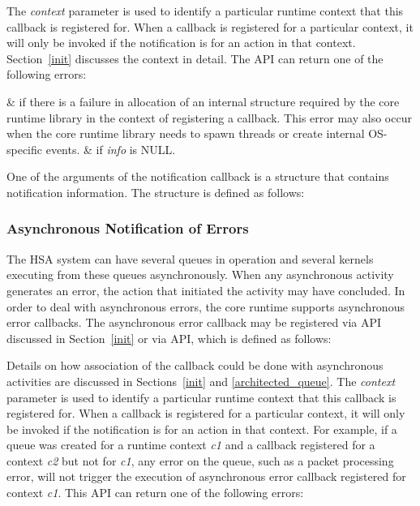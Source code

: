 

The {\itshape context} parameter is used to identify a particular
runtime context that this callback is registered for. When a
callback is registered for a particular context, it will only be
invoked if the notification is for an action in that context.
Section~\ref{init} discusses the context in detail. The
 API can return one of
the following errors:
\begin{easylist}
&  if there is a failure
in allocation of an internal structure required by the core runtime
library in the context of registering a callback. This error may
also occur when the core runtime library needs to spawn threads or
create internal OS-specific events. 
&  
if {\itshape info} is NULL.
\end{easylist}

One of the arguments of the notification callback is a structure
that contains notification information. The structure is defined as
follows:



\subsubsection{Asynchronous Notification of Errors}\label{asynnotif}

The HSA system can have several queues in operation and
several kernels executing from these queues asynchronously.
When any asynchronous activity generates an error, the action that
initiated the activity may have concluded. In order to deal with
asynchronous errors, the core runtime supports asynchronous error
callbacks. The asynchronous error callback may be registered via
 API discussed in Section~\ref{init} or via
 API, which is defined as
follows:



Details on how association of the callback could be done with
asynchronous activities are discussed in Sections~\ref{init} and
\ref{architected_queue}.  The {\itshape context} parameter is used
to identify a particular runtime context that this callback is
registered for. When a callback is registered for a particular
context, it will only be invoked if the notification is for an
action in that context. For example, if a queue was created for a
runtime context {\itshape c1} and a callback registered for a
context {\itshape c2} but not for {\itshape c1}, any error on the
queue, such as a packet processing error, will not trigger the
execution of asynchronous error callback registered for context
{\itshape c1}.  This API can return one of the following errors:

